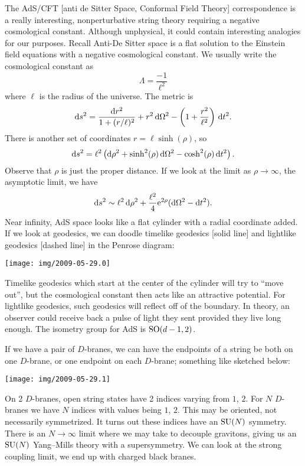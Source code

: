 
The AdS/CFT [anti de Sitter Space, Conformal Field Theory]
correspondence is a really interesting, nonperturbative string theory
requiring a negative cosmological constant. Although unphysical, it
could contain interesting analogies for our purposes.
Recall Anti-De Sitter space is a flat solution to the Einstein field
equations with a negative cosmological constant. We usually write the
cosmological constant as
\begin{equation}
\Lambda=\frac{-1}{\ell^{2}}
\end{equation}
where $\ell$ is the radius of the universe. The metric is
\begin{equation}
\mathrm{d} s^{2} = \frac{\mathrm{d} r^{2}}{1 + (r/\ell)^{2}} + r^{2}\,\mathrm{d}\Omega^{2} -
\left(1 + \frac{r^{2}}{\ell^{2}}\right)\,\mathrm{d} t^{2}.
\end{equation}
There is another set of coordinates $r=\ell\sinh(\rho)$, so
\begin{equation}
  \mathrm{d} s^{2} = \ell^{2}\left(
  \mathrm{d}\rho^{2} + \sinh^{2}(\rho)\,\mathrm{d}\Omega^{2} - \cosh^{2}(\rho)\,\mathrm{d} t^{2}
  \right).
\end{equation}
Observe that $\rho$ is just the proper distance. If we look at the limit
as $\rho\to\infty$, the asymptotic limit, we have
\begin{equation}
\mathrm{d} s^{2}\sim\ell^{2}\,\mathrm{d}\rho^{2} +
\frac{\ell^{2}}{4}\mathrm{e}^{2\rho}(\mathrm{d}\Omega^{2}-\mathrm{d} t^{2}).
\end{equation}
Near infinity, AdS space looks like a flat cylinder with a radial
coordinate added. If we look at geodesics, we can doodle timelike
geodesics [solid line] and lightlike geodesics [dashed line] in the
Penrose diagram:
\begin{center}
  \texttt{[image: img/2009-05-29.0]}
\end{center}
Timelike geodesics which
start at the center of the cylinder will try to ``move out'', but
the cosmological constant then acts like an attractive potential. For
lightlike geodesics, such geodesics will reflect off of the boundary. In
theory, an observer could receive back a pulse of light they sent
provided they live long enough. The isometry group for AdS is
$\operatorname{SO}(d-1,2)$.

If we have a pair of $D$-branes, we can have the endpoints of a string be both on
one $D$-brane, or one endpoint on each $D$-brane; something like
sketched below:
\begin{center}
  \texttt{[image: img/2009-05-29.1]}
\end{center}
On 2 $D$-branes, open string states have 2 indices varying from $1$, $2$.
For $N$ $D$-branes we have $N$ indices with values being $1$, $2$. This
may be oriented, not necessarily symmetrized. It turns out these indices
have an $\operatorname{SU}(N)$ symmetry. There is an $N\to\infty$ limit where we may
take to decouple gravitons, giving us an $\operatorname{SU}(N)$ Yang--Mills theory
with a supersymmetry. We can look at the strong coupling limit, we end
up with charged black branes.


